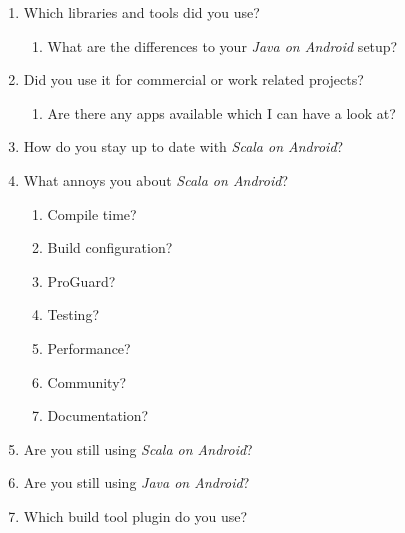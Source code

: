 \begin{enumerate}
\begin{enumerate}
		\item Which libraries and tools did you use?

		\begin{enumerate}

			\item What are the differences to your \textit{Java on Android} setup?

		\end{enumerate}

		\item Did you use it for commercial or work related projects?

		\begin{enumerate}

			\item Are there any apps available which I can have a look at?

		\end{enumerate}

		\item How do you stay up to date with \textit{Scala on Android}?

		\item What annoys you about \textit{Scala on Android}?

		\begin{enumerate}

			\item Compile time?

			\item Build configuration?

			\item ProGuard?

			\item Testing?

			\item Performance?

			\item Community?

			\item Documentation?

		\end{enumerate}

		\item Are you still using \textit{Scala on Android}?

		\item Are you still using \textit{Java on Android}?

		\item Which build tool plugin do you use?

		\begin{enumerate}


\end{enumerate}
\end{enumerate}
\end{enumerate}
